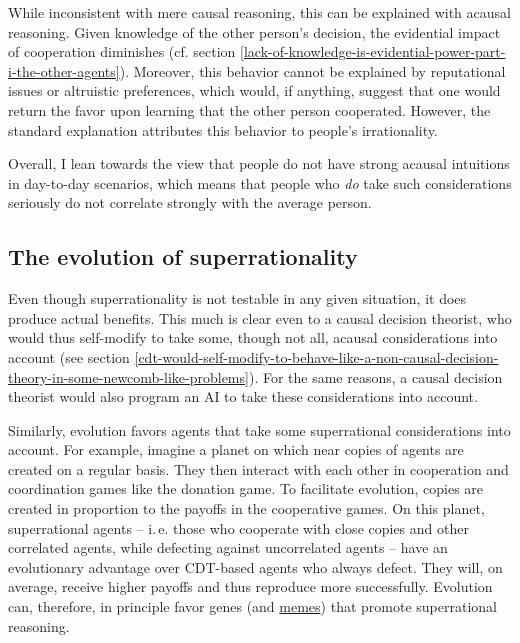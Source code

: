 While inconsistent with mere causal reasoning, this can be explained
with acausal reasoning. Given knowledge of the other person's decision,
the evidential impact of cooperation diminishes (cf. section
\ref{lack-of-knowledge-is-evidential-power-part-i-the-other-agents}).
Moreover, this behavior cannot be explained by reputational issues or
altruistic preferences, which would, if anything, suggest that one would
return the favor upon learning that the other person cooperated.
However, the standard explanation attributes this behavior to people's
irrationality.

Overall, I lean towards the view that people do not have strong acausal
intuitions in day-to-day scenarios, which means that people who
\emph{do} take such considerations seriously do not correlate strongly
with the average person.

\hypertarget{the-evolution-of-superrationality}{\subsection{The
evolution of superrationality}\label{the-evolution-of-superrationality}}

Even though superrationality is not testable in any given situation, it
does produce actual benefits. This much is clear even to a causal
decision theorist, who would thus self-modify to take some, though not
all, acausal considerations into account (see section
\ref{cdt-would-self-modify-to-behave-like-a-non-causal-decision-theory-in-some-newcomb-like-problems}). For the
same reasons, a causal decision theorist would also program an AI to
take these considerations into account.

Similarly, evolution favors agents that take some superrational
considerations into account. For example, imagine a planet on which near
copies of agents are created on a regular basis. They then interact with
each other in cooperation and coordination games like the donation game.
To facilitate evolution, copies are created in proportion to the payoffs
in the cooperative games. On this planet, superrational agents -- i.\,e.
those who cooperate with close copies and other correlated agents, while
defecting against uncorrelated agents -- have an evolutionary advantage
over CDT-based agents who always defect. They will, on average, receive
higher payoffs and thus reproduce more successfully. Evolution can,
therefore, in principle favor genes (and
\href{https://en.wikipedia.org/wiki/Meme}{memes}) that
promote superrational reasoning.

